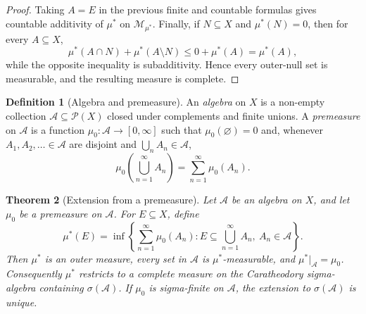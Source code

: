 \documentclass[11pt,openany]{book}
\numberwithin{equation}{chapter}
\theoremstyle{definition}
\newtheorem{definition}{Definition}[chapter]
\theoremstyle{plain}
\newtheorem{theorem}[definition]{Theorem}
\theoremstyle{remark}
\newcommand{\M}{\mathcal{M}}
\newcommand{\A}{\mathcal{A}}
\newcommand{\1}{\mathbf{1}}
\begin{document}
\begin{proof}
Taking \(A=E\) in the previous finite and countable formulas gives countable additivity of \(\mu^*\) on \(\M_{\mu^*}\). Finally, if \(N\subseteq X\) and \(\mu^*(N)=0\), then for every \(A\subseteq X\),
\[
  \mu^*(A\cap N)+\mu^*(A\setminus N)
  \leq 0+\mu^*(A)=\mu^*(A),
\]
while the opposite inequality is subadditivity. Hence every outer-null set is measurable, and the resulting measure is complete.
\end{proof}

\begin{definition}[Algebra and premeasure]
An \emph{algebra} on \(X\) is a non-empty collection \(\A\subseteq\mathcal P(X)\) closed under complements and finite unions. A \emph{premeasure} on \(\A\) is a function \(\mu_0:\A\to[0,\infty]\) such that \(\mu_0(\varnothing)=0\) and, whenever \(A_1,A_2,\ldots\in\A\) are disjoint and \(\bigcup_nA_n\in\A\),
\[
  \mu_0\left(\bigcup_{n=1}^{\infty}A_n\right)=\sum_{n=1}^{\infty}\mu_0(A_n).
\]
\end{definition}

\begin{theorem}[Extension from a premeasure]
Let \(\A\) be an algebra on \(X\), and let \(\mu_0\) be a premeasure on \(\A\). For \(E\subseteq X\), define
\[
  \mu^*(E)=\inf\left\{\sum_{n=1}^{\infty}\mu_0(A_n): E\subseteq\bigcup_{n=1}^{\infty}A_n,
  \ A_n\in\A\right\}.
\]
Then \(\mu^*\) is an outer measure, every set in \(\A\) is \(\mu^*\)-measurable, and \(\mu^*|_{\A}=\mu_0\). Consequently \(\mu^*\) restricts to a complete measure on the Caratheodory sigma-algebra containing \(\sigma(\A)\). If \(\mu_0\) is sigma-finite on \(\A\), the extension to \(\sigma(\A)\) is unique.
\end{theorem}
\end{document}
